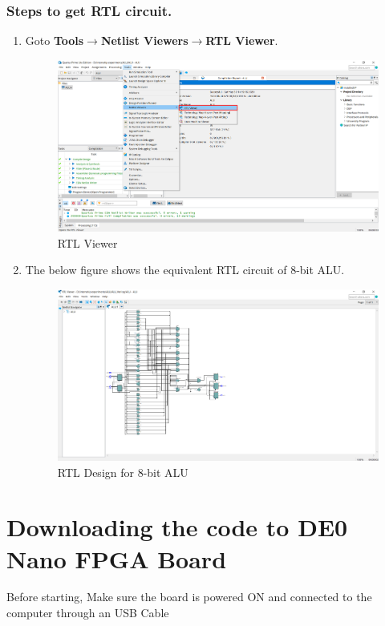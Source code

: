\documentclass[12pt,singleside,a4paper]{article}
\begin{document}
    \subsubsection*{Steps to get RTL circuit.}
        \begin{enumerate}
            \item Goto \textbf{Tools}$\rightarrow$\textbf{Netlist Viewers}$\rightarrow$\textbf{RTL Viewer}.
                \begin{figure}[H]
                     \centering
                  \includegraphics[scale=0.4]{rtl1.png}
                \caption{RTL Viewer}
                \end{figure}
            \item The below figure shows the equivalent RTL circuit of 8-bit ALU.      
\begin{figure}[H]
    \centering
    \includegraphics[scale=0.4]{rtlalu new.png}
    \caption{RTL Design for 8-bit ALU}
\end{figure}
\end{enumerate}

\newpage

 \section{Downloading the code to DE0 Nano FPGA Board}
 Before starting, Make sure the board is powered ON and connected to the computer through an USB Cable
 
\end{document}
